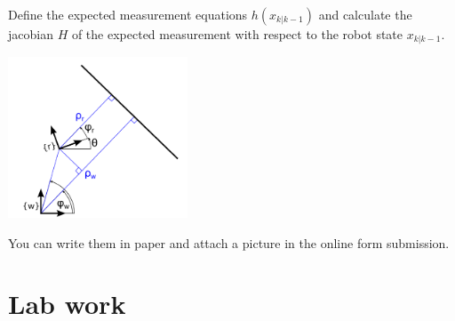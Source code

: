 \documentclass[a4paper,10pt]{article}
\begin{document}
Define the expected measurement equations $h(x_{k|k-1})$ and calculate the jacobian $H$ of the expected measurement with respect to the robot state $x_{k|k-1}$.
\begin{center}
	\includegraphics[width=0.40\textwidth]{pict/find_h.png}
	\label{ex}
\end{center}

You can write them in paper and attach a picture in the online form submission.

\section{Lab work}
\end{document}
